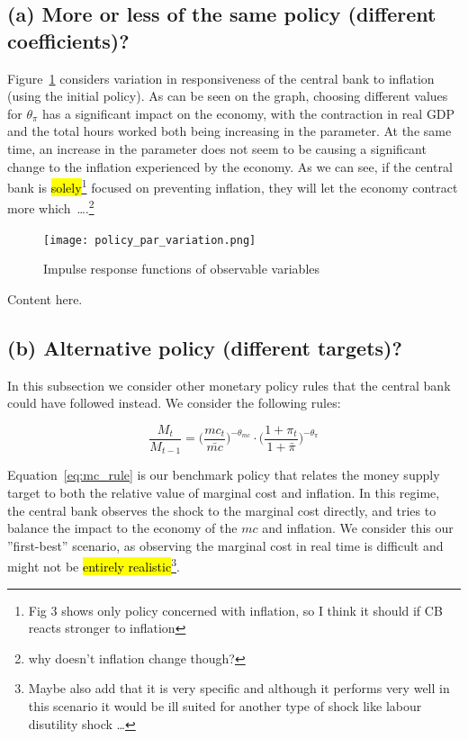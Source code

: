 \documentclass[12pt]{article}
\begin{document}
\subsection*{(a) More or less of the same policy (different coefficients)?}

Figure~\ref{fig:policy_par_variation} considers variation in responsiveness of the central bank to inflation (using the initial policy). As can be seen on the graph, choosing different values for $\theta_{\pi}$ has a significant impact on the economy, with the contraction in real GDP and the total hours worked both being increasing in the parameter. At the same time, an increase in the parameter does not seem to be causing a significant change to the inflation experienced by the economy. As we can see, if the central bank is \hl{solely}\footnote{Fig 3 shows only policy concerned with inflation, so I think it should if CB reacts stronger to inflation} focused on preventing inflation, they will let the economy contract more which\ \dots.\footnote{why doesn't inflation change though?}

\begin{figure}[!h]
    \caption{Impulse response functions of observable variables}\label{fig:policy_par_variation}
    \centering
    \texttt{[image: policy\_par\_variation.png]}
\end{figure}
Content here.


\subsection*{(b) Alternative policy (different targets)?}

In this subsection we consider other monetary policy rules that the central bank could have followed instead. We consider the following rules:

\begin{equation}\label{eq:mc_rule}
    \frac{M_t}{M_{t-1}}
          = \Big(\frac{mc_t}{\bar{mc}}\Big)^{-\theta_{mc}}
            \cdot \Big(\frac{1 + \pi_t}{1 + \bar{\pi}}\Big)^{-\theta_{\pi}}
\end{equation}

Equation~\ref{eq:mc_rule} is our benchmark policy that relates the money supply target to both the relative value of marginal cost and inflation. In this regime, the central bank observes the shock to the marginal cost directly, and tries to balance the impact to the economy of the $mc$ and inflation. We consider this our ''first-best'' scenario, as observing the marginal cost in real time is difficult and might not be \hl{entirely realistic}\footnote{Maybe also add that it is very specific and although it performs very well in this scenario it  would be ill suited for another type of shock like labour disutility shock \dots}.
\end{document}
